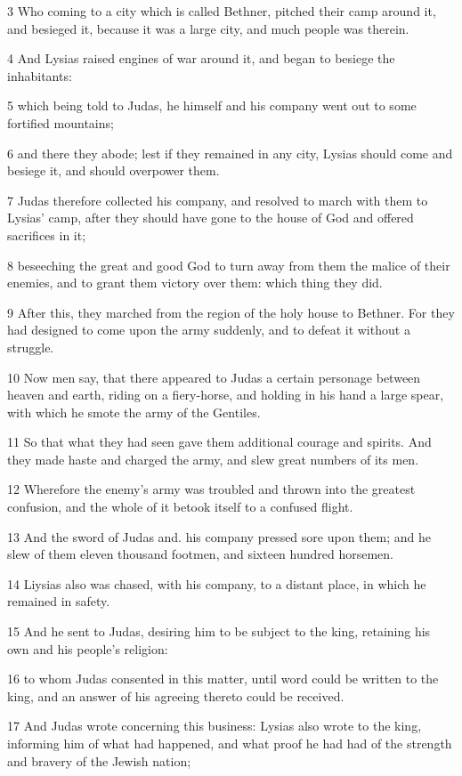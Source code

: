 3 Who coming to a city which is called Bethner, pitched their camp around it, and besieged it, because it was a large city, and much people was therein. 

4 And Lysias raised engines of war around it, and began to besiege the inhabitants: 

5 which being told to Judas, he himself and his company went out to some fortified mountains; 

6 and there they abode; lest if they remained in any city, Lysias should come and besiege it, and should overpower them. 

7 Judas therefore collected his company, and resolved to march with them to Lysias’ camp, after they should have gone to the house of God and offered sacrifices in it; 

8 beseeching the great and good God to turn away from them the malice of their enemies, and to grant them victory over them: which thing they did. 

9 After this, they marched from the region of the holy house to Bethner. For they had designed to come upon the army suddenly, and to defeat it without a struggle. 

10 Now men say, that there appeared to Judas a certain personage between heaven and earth, riding on a fiery-horse, and holding in his hand a large spear, with which he smote the army of the Gentiles. 

11 So that what they had seen gave them additional courage and spirits. And they made haste and charged the army, and slew great numbers of its men. 

12 Wherefore the enemy’s army was troubled and thrown into the greatest confusion, and the whole of it betook itself to a confused flight. 

13 And the sword of Judas and. his company pressed sore upon them; and he slew of them eleven thousand footmen, and sixteen hundred horsemen. 

14 Liysias also was chased, with his company, to a distant place, in which he remained in safety.

15 And he sent to Judas, desiring him to be subject to the king, retaining his own and his people’s religion: 

16 to whom Judas consented in this matter, until word could be written to the king, and an answer of his agreeing thereto could be received. 

17 And Judas wrote concerning this business: Lysias also wrote to the king, informing him of what had happened, and what proof he had had of the strength and bravery of the Jewish nation; 

